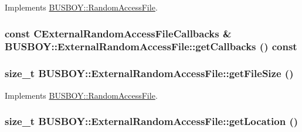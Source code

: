 Implements \hyperlink{classBUSBOY_1_1RandomAccessFile_a242d930b0e47a42bcc23c5f3e18bfb48}{BUSBOY::RandomAccessFile}.\hypertarget{classBUSBOY_1_1ExternalRandomAccessFile_a09ab5302feff98028a288e519e386e2f}{
\subsubsection[{getCallbacks}]{\setlength{\rightskip}{0pt plus 5cm}const {\bf CExternalRandomAccessFileCallbacks} \& BUSBOY::ExternalRandomAccessFile::getCallbacks () const}}
\label{classBUSBOY_1_1ExternalRandomAccessFile_a09ab5302feff98028a288e519e386e2f}
\hypertarget{classBUSBOY_1_1ExternalRandomAccessFile_ac989792676e37f9d363804162e21aef9}{
\subsubsection[{getFileSize}]{\setlength{\rightskip}{0pt plus 5cm}size\_\-t BUSBOY::ExternalRandomAccessFile::getFileSize ()}}
\label{classBUSBOY_1_1ExternalRandomAccessFile_ac989792676e37f9d363804162e21aef9}


Implements \hyperlink{classBUSBOY_1_1RandomAccessFile_aa06a60e534e2314196192a7c3b64bd77}{BUSBOY::RandomAccessFile}.\hypertarget{classBUSBOY_1_1ExternalRandomAccessFile_a513ff2125eb4dfb6ebb8456cbb74a386}{
\subsubsection[{getLocation}]{\setlength{\rightskip}{0pt plus 5cm}size\_\-t BUSBOY::ExternalRandomAccessFile::getLocation ()}}
\label{classBUSBOY_1_1ExternalRandomAccessFile_a513ff2125eb4dfb6ebb8456cbb74a386}


